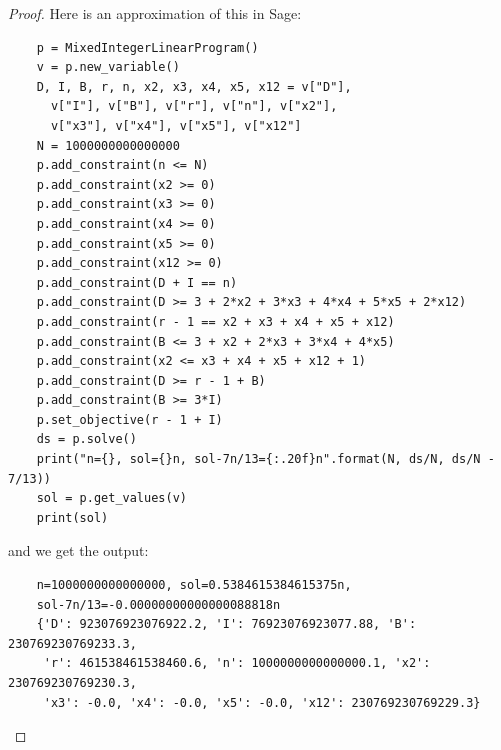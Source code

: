 \documentclass[12pt]{article}
\begin{document}
\begin{proof}
  Here is an approximation of this in Sage:
  \begin{verbatim}
    p = MixedIntegerLinearProgram()
    v = p.new_variable()
    D, I, B, r, n, x2, x3, x4, x5, x12 = v["D"],
      v["I"], v["B"], v["r"], v["n"], v["x2"],
      v["x3"], v["x4"], v["x5"], v["x12"]
    N = 1000000000000000
    p.add_constraint(n <= N)
    p.add_constraint(x2 >= 0)
    p.add_constraint(x3 >= 0)
    p.add_constraint(x4 >= 0)
    p.add_constraint(x5 >= 0)
    p.add_constraint(x12 >= 0)
    p.add_constraint(D + I == n)
    p.add_constraint(D >= 3 + 2*x2 + 3*x3 + 4*x4 + 5*x5 + 2*x12)
    p.add_constraint(r - 1 == x2 + x3 + x4 + x5 + x12)
    p.add_constraint(B <= 3 + x2 + 2*x3 + 3*x4 + 4*x5)
    p.add_constraint(x2 <= x3 + x4 + x5 + x12 + 1)
    p.add_constraint(D >= r - 1 + B)
    p.add_constraint(B >= 3*I)
    p.set_objective(r - 1 + I)
    ds = p.solve()
    print("n={}, sol={}n, sol-7n/13={:.20f}n".format(N, ds/N, ds/N - 7/13))
    sol = p.get_values(v)
    print(sol)
  \end{verbatim}
  and we get the output:
  \begin{verbatim}
    n=1000000000000000, sol=0.5384615384615375n,
    sol-7n/13=-0.00000000000000088818n
    {'D': 923076923076922.2, 'I': 76923076923077.88, 'B': 230769230769233.3,
     'r': 461538461538460.6, 'n': 1000000000000000.1, 'x2': 230769230769230.3,
     'x3': -0.0, 'x4': -0.0, 'x5': -0.0, 'x12': 230769230769229.3}
  \end{verbatim}

\end{proof}
\end{document}
